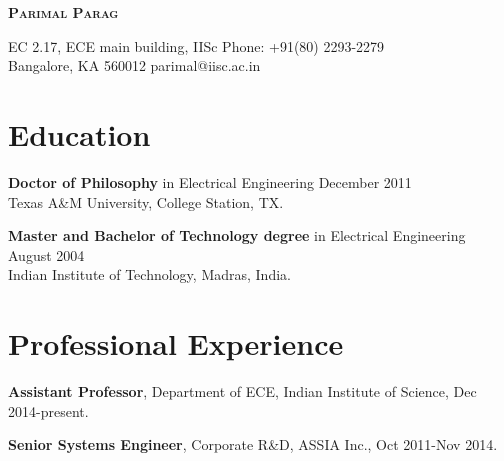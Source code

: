 \documentclass[10pt]{article}
\begin{document}
\begin{center}
\begin{LARGE}
\textsc{\textbf{Parimal Parag}}\\[3mm]
\end{LARGE}
\end{center}

\noindent
EC 2.17, ECE main building, IISc
\hfill Phone: +91(80) 2293-2279 \\
Bangalore, KA 560012
\hfill parimal@iisc.ac.in


\section*{Education}
\begin{shortlist}
\item \textbf{Doctor of Philosophy} in Electrical Engineering \hfill December 2011\\
{Texas A{\&}M University}, College Station, TX.

\item \textbf{Master and Bachelor of Technology degree} in Electrical Engineering \hfill August 2004\\
{Indian Institute of Technology}, Madras, India.

\end{shortlist}

\section*{Professional Experience}
\begin{shortlist}
\item \textbf{Assistant Professor}, Department of ECE, Indian Institute of Science, Dec 2014-present.
\item \textbf{Senior Systems Engineer}, Corporate R\&D, ASSIA Inc., Oct 2011-Nov 2014.
\end{shortlist}
\end{document}
